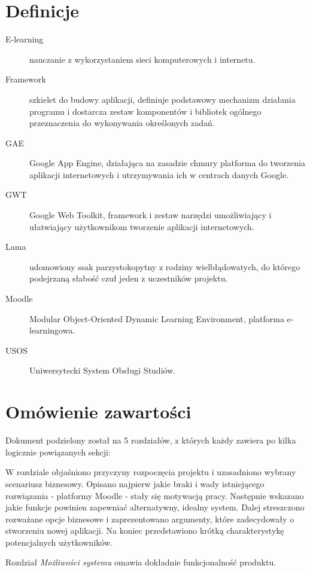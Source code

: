 \documentclass{pracamgr}
\begin{document}
\section{Definicje}
\begin{description}
   \item[E-learning]
      nauczanie z wykorzystaniem sieci komputerowych i internetu.
   \item[Framework]
      szkielet do budowy aplikacji, definiuje podstawowy mechanizm działania
      programu i dostarcza zestaw komponentów i bibliotek ogólnego
      przeznaczenia do wykonywania określonych zadań. 
   \item[GAE]
      Google App Engine, działająca na zasadzie chmury platforma do tworzenia 
      aplikacji internetowych i utrzymywania ich w centrach danych Google.
   \item[GWT]
      Google Web Toolkit, framework i zestaw narzędzi umożliwiający 
      i ułatwiający użytkownikom tworzenie aplikacji internetowych.
   \item[Lama]
      udomowiony ssak parzystokopytny z rodziny wielbłądowatych, do którego
      podejrzaną słabość czuł jeden z uczestników projektu.
   \item[Moodle]
      Modular Object-Oriented Dynamic Learning Environment, platforma 
      e-learningowa. 
   \item[USOS]
      Uniwersytecki System Obsługi Studiów.
\end{description}

%
%
\section{Omówienie zawartości}

Dokument podzielony został na 5 rozdziałów, z których każdy zawiera po kilka
logicznie powiązanych sekcji:

W rozdziale \emph{ } objaśniono przyczyny rozpoczęcia projektu i
uzasadniono wybrany scenariusz biznesowy. Opisano najpierw jakie braki i wady 
istniejącego rozwiązania - platformy Moodle - stały się motywacją pracy. 
Następnie wskazano jakie funkcje powinien zapewniać alternatywny, idealny
system. Dalej streszczono rozważane opcje biznesowe i zaprezentowano argumenty,
które zadecydowały o stworzeniu nowej aplikacji. Na koniec przedstawiono krótką
charakterystykę potencjalnych użytkowników.

Rozdział \emph{Możliwości systemu} omawia dokładnie funkcjonalność produktu.
\end{document}
